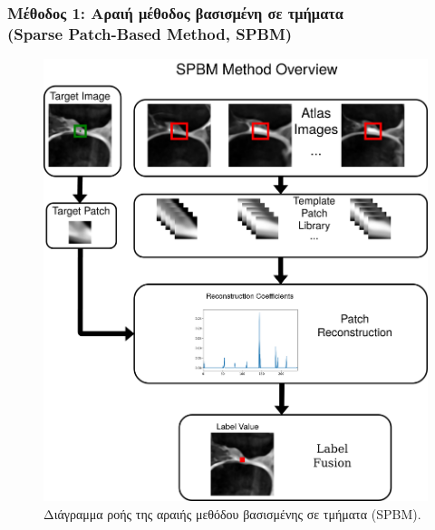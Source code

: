 \documentclass{beamer}
\begin{document}
\begin{frame}
\frametitle{Μέθοδος 1: Αραιή μέθοδος βασισμένη σε τμήματα \\
(Sparse Patch-Based Method, SPBM)}

\begin{figure}[H]
    \centering
    \includegraphics[height=0.8\textheight]{SPBM_method.png}
    \caption{Διάγραμμα ροής της αραιής μεθόδου βασισμένης σε τμήματα (SPBM).}
    \label{fig:SPBM_method:1}
\end{figure}

\end{frame}
\end{document}
